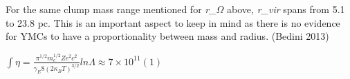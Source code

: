 For the same clump mass range mentioned for \textit{r_{$\Omega$}} above, \textit{r_{vir}} spans from 5.1 to 23.8 pc. This is an important aspect to keep in mind as there is no evidence for YMCs to have a proportionality between mass and radius. (Bedini 2013)

$∫\eta=\frac{\pi^{1/2}m^{1/2}_{e}Ze^{2}c^{2}}{\gamma_{E}8(2\kappa_{B}T)^{3/2}} lnΛ\approx7×10^{11}       (1)$

